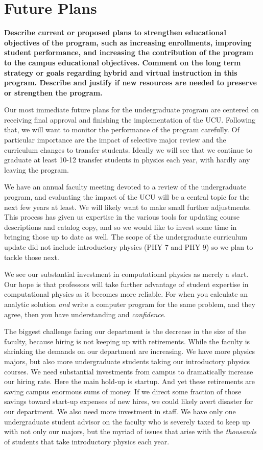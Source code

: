 \documentclass[12pt]{article}
\begin{document}
\newpage
\section{Future Plans}
{\bf Describe current or proposed plans to strengthen educational
  objectives of the program, such as increasing enrollments, improving
  student performance, and increasing the contribution of the program
  to the campus educational objectives. Comment on the long term
  strategy or goals regarding hybrid and virtual instruction in this
  program. Describe and justify if new resources are needed to
  preserve or strengthen the program.}

Our most immediate future plans for the undergraduate program are
centered on receiving final approval and finishing the implementation
of the UCU.  Following that, we will want to monitor the performance
of the program carefully.  Of particular importance are the impact of
selective major review and the curriculum changes to transfer
students.  Ideally we will see that we continue to graduate at least
10-12 transfer students in physics each year, with hardly any leaving
the program.

We have an annual faculty meeting devoted to a review of the
undergraduate program, and evaluating the impact of the UCU will be a
central topic for the next few years at least.  We will likely want to
make small further adjustments.  This process has given us expertise
in the various tools for updating course descriptions and catalog
copy, and so we would like to invest some time in bringing those up to
date as well.  The scope of the undergraduate curriculum update did
not include introductory physics (PHY 7 and PHY 9) so we plan to
tackle those next.

We see our substantial investment in computational physics as merely a
start.  Our hope is that professors will take further advantage of
student expertise in computational physics as it becomes more
reliable.  For when you calculate an analytic solution {\em and} write
a computer program for the same problem, and they agree, then you have
understanding and {\em confidence}.

The biggest challenge facing our department is the decrease in the
size of the faculty, because hiring is not keeping up with
retirements.  While the faculty is shrinking the demands on our
department are increasing.  We have more physics majors, but also more
undergraduate students taking our introductory physics courses.  We
need substantial investments from campus to dramatically increase our
hiring rate.  Here the main hold-up is startup.  And yet these
retirements are saving campus enormous sums of money.  If we direct
some fraction of those savings toward start-up expenses of new hires,
we could likely avert disaster for our department.  We also need more
investment in staff.  We have only one undergraduate student advisor
on the faculty who is severely taxed to keep up with not only our
majors, but the myriad of issues that arise with the {\em thousands}
of students that take introductory physics each year.
\end{document}
